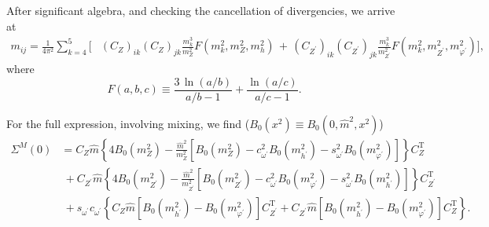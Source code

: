 After significant algebra, and checking the cancellation of divergencies, we arrive at 
%
\begin{align}\label{eq:masses_general2}
 m_{ij} = \frac{1}{4\pi^2}\sum_{k=4}^5 \Big[ & (C_Z)_{ik} (C_Z)_{jk} \frac{m_k^3}{m_Z^2}F(m_k^2,m_Z^2,m_h^2)  \,+\, (C_{Z^\prime})_{ik} (C_{Z^\prime})_{jk} \frac{m_k^3}{m_{Z^\prime}^2}F(m_k^2,m_{Z^\prime}^2,m_{\varphi^\prime}^2) \Big],
\end{align} 
%
where
%
\begin{equation} \label{eq:loop_function_2}
F(a,b,c) \equiv \frac{3 \, \ln{(a/b)}}{a/b - 1}  + \frac{\ln{(a/c)}}{a/c - 1}.
\end{equation}
%

For the full expression, involving mixing, we find ($B_0(x^2) \equiv B_0(0,\hat{m}^2,x^2)$)
%
\begin{align*}
%
    \Sigma^M(0) &= C_Z\hat{m}\left\{ 4B_0(m_Z^2) -
\frac{\hat{m}^2}{m_Z^2}\left[B_0(m_Z^2) - c_{\omega^\prime}^2B_0(m_{h^\prime}^2)- s_{\omega^\prime}^2B_0(m_{\varphi^\prime}^2)\right] \right\}C_Z^\text{T}\\
%
&~+C_{Z^\prime}\hat{m}\left\{ 4B_0(m_{Z^\prime}^2) -
\frac{\hat{m}^2}{m_{Z^\prime}^2}\left[B_0(m_{Z^\prime}^2) - c_{\omega^\prime}^2B_0(m_{\varphi^\prime}^2)- s_{\omega^\prime}^2B_0(m_{h^\prime}^2)\right] \right\}C_{Z^\prime}^\text{T}\\
%
&~+s_{\omega^\prime} c_{\omega^\prime} \left\{C_Z \hat{m}\left[B_0(m_{h^\prime}^2) -B_0(m_{\varphi^\prime}^2) \right]C_{Z^\prime}^\text{T}+C_{Z^\prime}\hat{m}\left[ B_0(m_{h^\prime}^2) -B_0(m_{\varphi^\prime}^2) \right]C_Z^\text{T}\right\}.
%
\end{align*}

